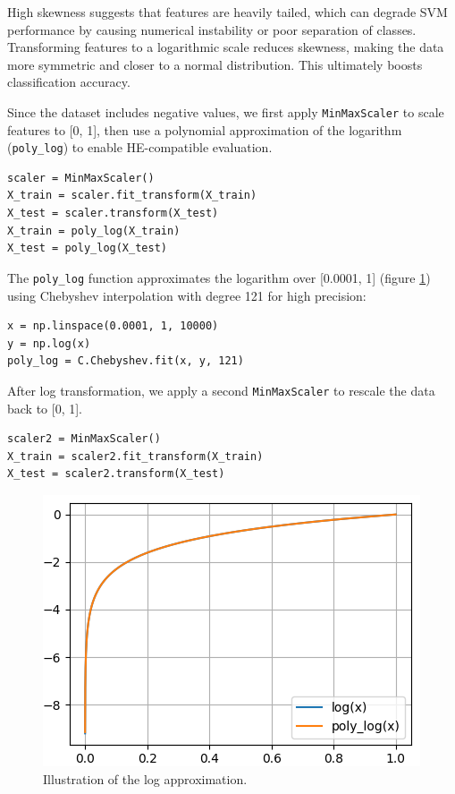 \documentclass[article]{iacrtrans}
\begin{document}
High skewness suggests that features are heavily tailed, which can degrade SVM performance by causing numerical instability or poor separation of classes. Transforming features to a logarithmic scale reduces skewness, making the data more symmetric and closer to a normal distribution. This ultimately boosts classification accuracy.

Since the dataset includes negative values, we first apply \texttt{MinMaxScaler} to scale features to [0, 1], then use a polynomial approximation of the logarithm (\texttt{poly\_log}) to enable HE-compatible evaluation.

\begin{lstlisting}
scaler = MinMaxScaler()
X_train = scaler.fit_transform(X_train)
X_test = scaler.transform(X_test)
X_train = poly_log(X_train)
X_test = poly_log(X_test)
\end{lstlisting}

The \texttt{poly\_log} function approximates the logarithm over [0.0001, 1] (figure \ref{fig:log-approximation}) using Chebyshev interpolation with degree 121 for high precision:

\begin{lstlisting}
x = np.linspace(0.0001, 1, 10000)
y = np.log(x)
poly_log = C.Chebyshev.fit(x, y, 121)
\end{lstlisting}

After log transformation, we apply a second \texttt{MinMaxScaler} to rescale the data back to [0, 1].

\begin{lstlisting}
scaler2 = MinMaxScaler()
X_train = scaler2.fit_transform(X_train)
X_test = scaler2.transform(X_test)
\end{lstlisting}

\begin{figure}
    \centering
    \includegraphics[width=0.5\linewidth]{figures_fraud_detection/log_approximation.png}
    \caption{Illustration of the log approximation.}
    \label{fig:log-approximation}
\end{figure}
\end{document}
